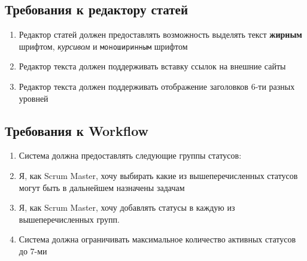 \documentclass{article}
\begin{document}
\subsection{Требования к редактору статей}
\begin{enumerate}[label=\textbf{AER\arabic*}.]
	\item Редактор статей должен предоставлять возможность выделять текст
	      \textbf{жирным} шрифтом, \textit{курсивом} и \texttt{моноширинным} шрифтом
	\item Редактор текста должен поддерживать вставку ссылок на внешние сайты
	\item Редактор текста должен поддерживать отображение заголовков 6-ти разных
	      уровней
\end{enumerate}

\subsection{Требования к Workflow}
\begin{enumerate}[label=\textbf{WFR\arabic*}.]
	\item Система должна предоставлять следующие группы статусов:
	\item Я, как Scrum Master, хочу выбирать какие из вышеперечисленных статусов могут быть в дальнейшем назначены задачам
	\item Я, как Scrum Master, хочу добавлять статусы в каждую из вышеперечисленных групп.
	\item Система должна ограничивать максимальное количество активных статусов до 7-ми
\end{enumerate}
\end{document}
